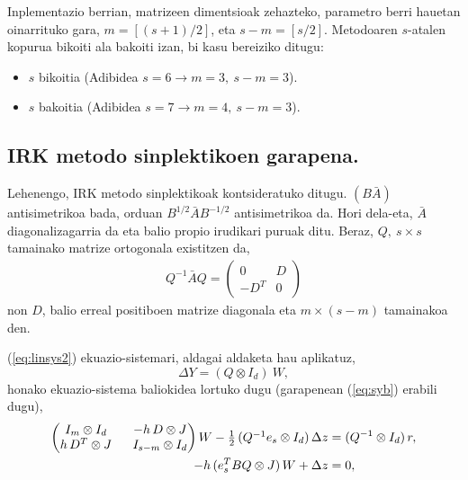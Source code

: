 Inplementazio berrian, matrizeen dimentsioak zehazteko, parametro berri hauetan oinarrituko gara,
$m=[(s+1)/2]$, eta $s-m =[s/2]$. Metodoaren $s$-atalen kopurua bikoiti ala bakoiti izan, bi kasu bereiziko ditugu:
\begin{itemize}
\item $s$ bikoitia (Adibidea $s=6 \rightarrow m=3,\ s-m=3$).
\item $s$ bakoitia (Adibidea $s=7 \rightarrow m=4,\ s-m=3$).
\end{itemize}

\subsection{IRK metodo sinplektikoen garapena.}
\label{ss:733}

Lehenengo, IRK metodo sinplektikoak kontsideratuko ditugu. $(B \bar{A})$ antisimetrikoa bada, orduan $B^{1/2}\bar{A}B^{-1/2}$ antisimetrikoa da. Hori dela-eta, $\bar{A}$ diagonalizagarria da eta  balio propio irudikari puruak ditu. Beraz,  $Q, \ s \times s$ tamainako matrize ortogonala existitzen da,
\begin{align}
\label{eq:syb}
Q^{-1}\bar{A}Q=
\left(
\begin{matrix}
0 & D \\
-D^T & 0
\end{matrix}
\right)
\end{align}
non $D$,  balio erreal positiboen matrize diagonala eta $m \times (s-m)$ tamainakoa den. 

(\ref{eq:linsys2}) ekuazio-sistemari, aldagai aldaketa hau aplikatuz,
\begin{equation*}
 \Delta Y = (Q \otimes I_d) \ W,
\end{equation*}
%
honako ekuazio-sistema baliokidea lortuko dugu (garapenean (\ref{eq:syb}) erabili dugu),
\begin{equation}
\label{eq:linsys3}
\begin{split}
  \left(
  \begin{matrix}
    I_m \otimes I_d \ & \  -h \, D \otimes J  \\
    h \, D^T \otimes J \ & \ I_{s-m} \otimes I_d 
  \end{matrix}
\right) W -  \textstyle \frac12\, (Q^{-1} e_s \otimes I_d) \, \Delta z &=  (Q^{-1} \otimes I_d )\, r, \\
- h \, (e_s^T  B Q \otimes J) \, W + \Delta z &= 0,
\end{split}
\end{equation}

